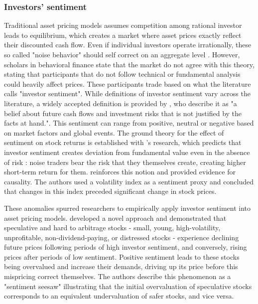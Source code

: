\subsubsection{Investors' sentiment}


Traditional asset pricing models assumes competition among rational investor leads to equilibrium, which creates a market where asset prices exactly reflect their discounted cash flow. Even if individual investors operate irrationally, these so called "noise behavior" should self correct on an aggregate level \cite{friedman_1953}. However, scholars in behavioral finance state that the market do not agree with this theory, stating that participants that do not follow technical or fundamental analysis could heavily affect prices. These participants trade based on what the literature calls "investor sentiment". While definitions of investor sentiment vary across the literature, a widely accepted definition is provided by , who describe it as "a belief about future cash flows and investment risks that is not justified by the facts at hand.". This sentiment can range from positive, neutral or negative based on market factors and global events. The ground theory for the effect of sentiment on stock returns is established with 's research, which predicts that investor sentiment creates deviation from fundamental value even in the absence of risk : noise traders bear the risk that they themselves create, creating higher short-term return for them.  reinforces this notion and provided evidence for causality. The authors used a volatility index as a sentiment proxy and concluded that changes in this index preceded significant change in stock prices.


These anomalies spurred researchers to empirically apply investor sentiment into asset pricing models.  developed a novel approach and demonstrated that speculative and hard to arbitrage stocks - small, young, high-volatility, unprofitable, non-dividend-paying, or distressed stocks - experience declining future prices following periods of high investor sentiment, and conversely, rising prices after periods of low sentiment. Positive sentiment leads to these stocks being overvalued and increase their demands, driving up its price before this mispricing correct themselves. The authors describe this phenomenon as a "sentiment seesaw" illustrating that the initial overvaluation of speculative stocks corresponds to an equivalent undervaluation of safer stocks, and vice versa. 

